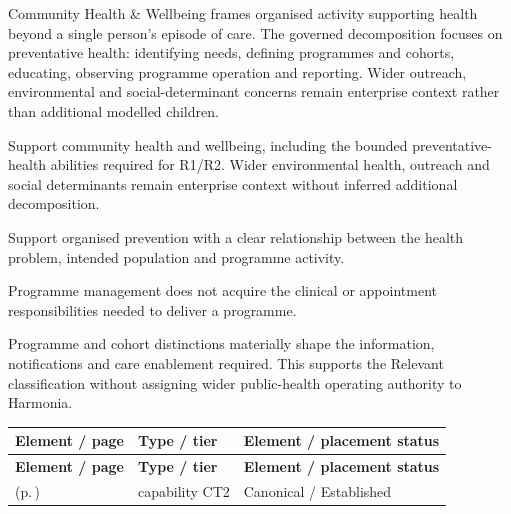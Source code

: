 Community Health \& Wellbeing frames organised activity supporting health beyond a single person's episode of care. The governed decomposition focuses on preventative health: identifying needs, defining programmes and cohorts, educating, observing programme operation and reporting. Wider outreach, environmental and social-determinant concerns remain enterprise context rather than additional modelled children.



Support community health and wellbeing, including the bounded preventative-health abilities required for R1/\allowbreak{}R2. Wider environmental health, outreach and social determinants remain enterprise context without inferred additional decomposition.



Support organised prevention with a clear relationship between the health problem, intended population and programme activity.



Programme management does not acquire the clinical or appointment responsibilities needed to deliver a programme.



Programme and cohort distinctions materially shape the information, notifications and care enablement required. This supports the Relevant classification without assigning wider public-health operating authority to Harmonia.


\begingroup\small\setlength{\TableWidth}{\dimexpr\linewidth-6\tabcolsep-4\arrayrulewidth\relax}
\begin{longtable}{|>{\raggedright\arraybackslash}p{0.52\TableWidth}|>{\raggedright\arraybackslash}p{0.2\TableWidth}|>{\raggedright\arraybackslash}p{0.28\TableWidth}|}
\hline\rowcolor{TableHead}\textbf{Element / page} & \textbf{Type / tier} & \textbf{Element / placement status}\\\hline\endfirsthead
\hline\rowcolor{TableHead}\textbf{Element / page} & \textbf{Type / tier} & \textbf{Element / placement status}\\\hline\endhead
\hline\endfoot
\nameref{cap:bc-preventative-health} (p.\,\pageref{cap:bc-preventative-health}) & capability CT2 & Canonical / Established\\\hline
\end{longtable}\endgroup

